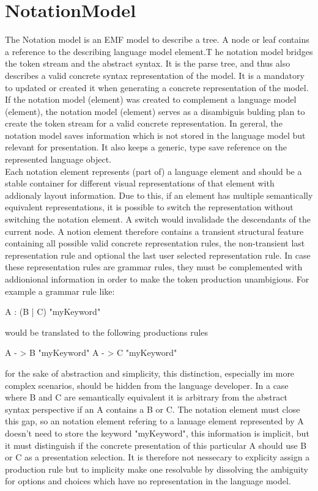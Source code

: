 \section{NotationModel}
The Notation model is an EMF model to describe a tree. A node or leaf contains a reference to the describing language model element.T he notation model bridges the token stream and the abstract syntax. It is the parse tree, and thus also describes a valid concrete syntax representation of the model.  It is a mandatory to updated or created it when generating a concrete representation of the model. If the notation model (element) was created to complement a language model (element), the notation model (element) serves as a disambiguis bulding plan to create the token stream for a valid concrete representation. In gereral, the notation model saves information which is not stored in the language model but relevant for presentation. It also keeps a generic, type save reference on the represented language object.\\
Each notation element represents (part of) a language element and should be a stable container for different visual representations of that element with addionaly layout information.  Due to this, if an element has multiple semantically equivalent representations, it is possible to switch the representation without switching the notation element. A switch would invalidade the descendants of the current node. A notion element therefore contains a transient structural feature containing all possible valid concrete representation rules, the non-transient last representation rule and optional the last user selected representation rule. In case these representation rules are grammar rules, they must be complemented with addionional information in order to make the token production unambigious. For example a grammar rule like:
\begin{xtxt}
A : (B | C) "myKeyword"
\end{xtxt}
would be translated to the following productions rules 
\begin{xtxt}
A - > B "myKeyword"
A - > C "myKeyword"
\end{xtxt}
for the sake of abstraction and simplicity, this distinction, especially im more complex scenarios, should be hidden from the language developer. In a case where B and C are semantically equivalent  it is arbitrary from the abstract syntax perspective if an A contains a B or C. The notation element must close this gap, so an notation element refering to a lanuage element represented by A doesn't need to store the keyword "myKeyword", this information is implicit, but it must distinguish if the concrete presentation of this particular A should use B or C as a presentation selection. It is therefore not nessecary to explicity assign  a production rule but to implicity make one resolvable by dissolving the ambiguity for options and choices which have no representation in the language model. \\
